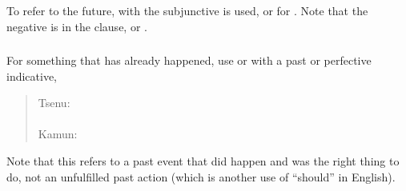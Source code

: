 \subsubsection{} To refer to the future,  with the subjunctive
is used,  or  for .  Note that the negative is
in the  clause,  or  .

\subsubsection{} For something that has already happened, use 
or  with a past or perfective indicative,

\begin{quotation}
\noindent Tsenu: \\
\noindent{} \\

\noindent Kamun: \\
\noindent{}
\end{quotation}

\noindent Note that this refers to a past event that did happen and
was the right thing to do, not an unfulfilled past action (which is
another use of ``should'' in English).
